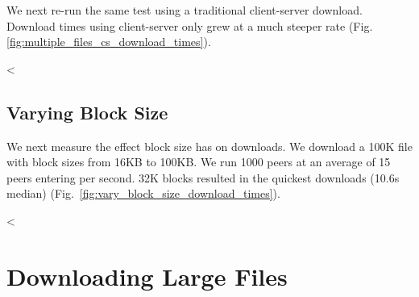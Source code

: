 We next re-run the same test using a traditional client-server download.  Download times using client-server only grew at a much steeper rate (Fig. \ref{fig:multiple_files_cs_download_times}).

<%

\subsection{Varying Block Size}

We next measure the effect block size has on downloads.  We download a 100K file with block sizes from 16KB to 100KB.  We run 1000 peers at an average of 15 peers entering per second.  32K blocks resulted in the quickest downloads (10.6s median) (Fig.~\ref{fig:vary_block_size_download_times}).


<%

\section{Downloading Large Files}

